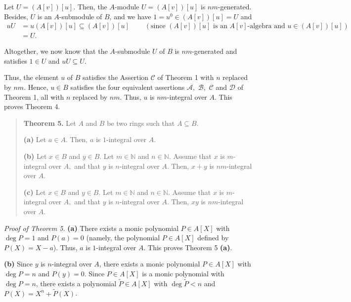 \documentclass[12pt,final,notitlepage,onecolumn]{article}%
\begin{document}
Let $U=\left(  A\left[  v\right]  \right)  \left[  u\right]  $. Then, the
$A$-module $U=\left(  A\left[  v\right]  \right)  \left[  u\right]  $ is
$nm$-generated. Besides, $U$ is an $A$-submodule of $B$, and we have
$1=u^{0}\in\left(  A\left[  v\right]  \right)  \left[  u\right]  =U$ and%
\begin{align*}
uU  &  =u\left(  A\left[  v\right]  \right)  \left[  u\right]  \subseteq
\left(  A\left[  v\right]  \right)  \left[  u\right]
\ \ \ \ \ \ \ \ \ \ \left(  \text{since }\left(  A\left[  v\right]  \right)
\left[  u\right]  \text{ is an }A\left[  v\right]  \text{-algebra and }%
u\in\left(  A\left[  v\right]  \right)  \left[  u\right]  \right) \\
&  =U.
\end{align*}


Altogether, we now know that the $A$-submodule $U$ of $B$ is $nm$-generated
and satisfies $1\in U$ and $uU\subseteq U$.

Thus, the element $u$ of $B$ satisfies the Assertion $\mathcal{C}$ of Theorem
1 with $n$ replaced by $nm$. Hence, $u\in B$ satisfies the four equivalent
assertions $\mathcal{A},$ $\mathcal{B},$ $\mathcal{C}$ and $\mathcal{D}$ of
Theorem 1, all with $n$ replaced by $nm$. Thus, $u$ is $nm$-integral over $A$.
This proves Theorem 4.

\begin{quote}
\textbf{Theorem 5.} Let $A$ and $B$ be two rings such that $A\subseteq B$.

\textbf{(a)} Let $a\in A$. Then, $a$ is $1$-integral over $A$.

\textbf{(b)} Let $x\in B$ and $y\in B$. Let $m\in\mathbb{N}$ and
$n\in\mathbb{N}$. Assume that $x$ is $m$-integral over $A,$ and that $y$ is
$n$-integral over $A$. Then, $x+y$ is $nm$-integral over $A$.

\textbf{(c)} Let $x\in B$ and $y\in B$. Let $m\in\mathbb{N}$ and
$n\in\mathbb{N}$. Assume that $x$ is $m$-integral over $A,$ and that $y$ is
$n$-integral over $A$. Then, $xy$ is $nm$-integral over $A$.
\end{quote}

\textit{Proof of Theorem 5.} \textbf{(a)} There exists a monic polynomial
$P\in A\left[  X\right]  $ with $\deg P=1$ and $P\left(  a\right)  =0$
(namely, the polynomial $P\in A\left[  X\right]  $ defined by $P\left(
X\right)  =X-a$). Thus, $a$ is $1$-integral over $A$. This proves Theorem 5
\textbf{(a)}.

\textbf{(b)} Since $y$ is $n$-integral over $A$, there exists a monic
polynomial $P\in A\left[  X\right]  $ with $\deg P=n$ and $P\left(  y\right)
=0$. Since $P\in A\left[  X\right]  $ is a monic polynomial with $\deg P=n$,
there exists a polynomial $\widetilde{P}\in A\left[  X\right]  $ with
$\deg\widetilde{P}<n$ and $P\left(  X\right)  =X^{n}+\widetilde{P}\left(
X\right)  $.
\end{document}
